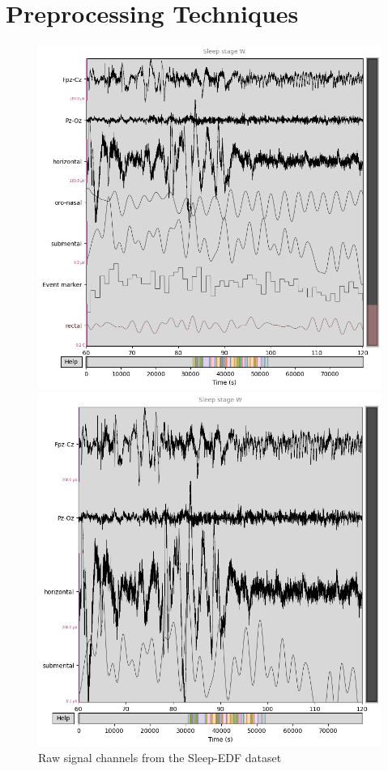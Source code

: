 \section{Preprocessing Techniques}
\begin{figure}[H]
	\centering
	\begin{minipage}{0.48\textwidth}
		\centering
		\includegraphics[width=\linewidth]{img/paper_3/Signals}
		\caption{Raw signal channels from the Sleep-EDF dataset}
		\label{fig:raw_signals}
	\end{minipage}
	\hfill
	\begin{minipage}{0.48\textwidth}
		\centering
		\includegraphics[width=\linewidth]{img/paper_3/filtered chanels}

\end{minipage}
\end{figure}
